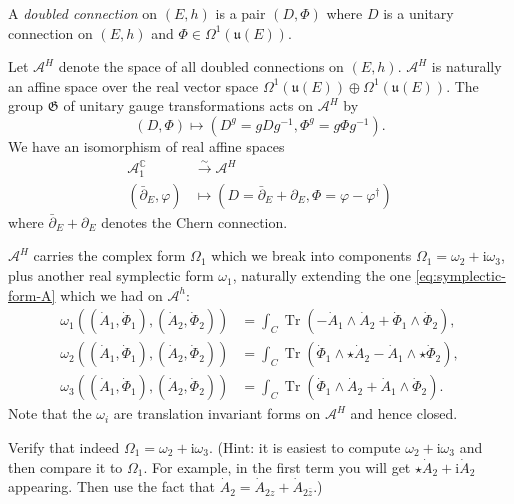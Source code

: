 \documentclass[12pt,letterpaper,reqno]{article}
\numberwithin{equation}{section}
\newcommand{\fu}{{\mathfrak u}}
\newcommand{\fG}{{\mathfrak G}}
\newcommand{\cA}{\ensuremath{\mathcal A}}
\newcommand{\C}{\ensuremath{\mathbb C}}
\newcommand{\I}{{\mathrm i}}
\newcommand{\simarrow}{\xrightarrow\sim}
\newcommand{\ti}[1]{\textit{#1}}
\DeclareMathOperator{\Tr}{Tr}
\begin{document}
\begin{defn} A \ti{doubled connection} on $(E,h)$ is a pair
$(D,\Phi)$ where $D$ is a unitary connection on $(E,h)$
and $\Phi \in \Omega^1(\fu(E))$.
\end{defn}

Let $\cA^H$ denote the space of all doubled connections on $(E,h)$.
$\cA^H$ is naturally an affine space over the real vector space
$\Omega^1(\fu(E)) \oplus \Omega^1(\fu(E))$.
The group $\fG$ of unitary gauge transformations
acts on $\cA^H$ by
\begin{equation}
  (D,\Phi) \mapsto (D^g = g D g^{-1}, \Phi^g = g \Phi g^{-1}).
\end{equation}
We have an isomorphism of real affine spaces
\begin{align}
    \cA^\C_1 &\simarrow \cA^H \\
    (\bar\partial_E,\varphi) & \mapsto (D = \bar\partial_E + \partial_E, \Phi = \varphi - \varphi^\dagger)
\end{align}
where $\bar\partial_E + \partial_E$ denotes the Chern connection.

$\cA^H$ carries the complex form $\Omega_1$ which we break into
components $\Omega_1 = \omega_2 + \I \omega_3$, plus another
real symplectic form $\omega_1$, naturally extending the one \eqref{eq:symplectic-form-A} which
we had on $\cA^h$:
\begin{subequations} \label{eq:symplectic-forms-higgs}
\begin{align}
  \omega_1((\dot A_1, \dot \Phi_1),(\dot A_2, \dot \Phi_2)) &= \int_C \Tr(- \dot A_1 \wedge \dot A_2 + \dot \Phi_1 \wedge \dot \Phi_2), \\
  \omega_2((\dot A_1, \dot \Phi_1),(\dot A_2, \dot \Phi_2)) &= \int_C \Tr(\dot \Phi_1 \wedge \star \dot A_2 - \dot A_1 \wedge \star \dot \Phi_2), \\
  \omega_3((\dot A_1, \dot \Phi_1),(\dot A_2, \dot \Phi_2)) &= \int_C \Tr(\dot\Phi_1 \wedge \dot A_2 + \dot A_1 \wedge \dot \Phi_2).
\end{align}
\end{subequations}
Note that the $\omega_i$ are translation invariant forms on $\cA^H$ and hence
closed.

\begin{exercise} Verify that indeed $\Omega_1 = \omega_2 + \I \omega_3$. (Hint: it is
easiest to compute $\omega_2 + \I \omega_3$ and then compare it to $\Omega_1$.
For example, in the first term you will get $\star \dot{A}_2 + \I \dot{A}_2$ appearing.
Then use the fact that $\dot{A}_2 = \dot{A}_{2z} + \dot{A}_{2\bar{z}}$.)
\end{exercise}
\end{document}
